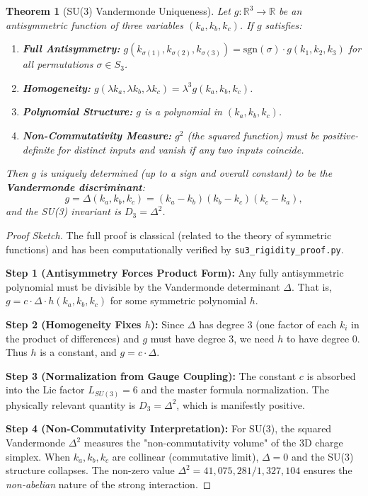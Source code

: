 \documentclass[11pt,twocolumn]{article}
\newtheorem{theorem}{Theorem}[section]
\begin{document}
\begin{theorem}[SU(3) Vandermonde Uniqueness]
Let $g: \mathbb{R}^3 \to \mathbb{R}$ be an antisymmetric function of three variables $(k_a, k_b, k_c)$. If $g$ satisfies:
\begin{enumerate}[label=(\roman*)]
    \item \textbf{Full Antisymmetry:} $g(k_{\sigma(1)}, k_{\sigma(2)}, k_{\sigma(3)}) = \text{sgn}(\sigma) \cdot g(k_1, k_2, k_3)$ for all permutations $\sigma \in S_3$.
    \item \textbf{Homogeneity:} $g(\lambda k_a, \lambda k_b, \lambda k_c) = \lambda^3 g(k_a, k_b, k_c)$.
    \item \textbf{Polynomial Structure:} $g$ is a polynomial in $(k_a, k_b, k_c)$.
    \item \textbf{Non-Commutativity Measure:} $g^2$ (the squared function) must be positive-definite for distinct inputs and vanish if any two inputs coincide.
\end{enumerate}
Then $g$ is uniquely determined (up to a sign and overall constant) to be the \textbf{Vandermonde discriminant}:
\begin{equation*}
g = \Delta(k_a, k_b, k_c) = (k_a - k_b)(k_b - k_c)(k_c - k_a),
\end{equation*}
and the SU(3) invariant is $D_3 = \Delta^2$.
\end{theorem}

\begin{proof}[Proof Sketch]
The full proof is classical (related to the theory of symmetric functions) and has been computationally verified by \texttt{su3\_rigidity\_proof.py}.

\textbf{Step 1 (Antisymmetry Forces Product Form):}
Any fully antisymmetric polynomial must be divisible by the Vandermonde determinant $\Delta$. That is, $g = c \cdot \Delta \cdot h(k_a, k_b, k_c)$ for some symmetric polynomial $h$.

\textbf{Step 2 (Homogeneity Fixes $h$):}
Since $\Delta$ has degree 3 (one factor of each $k_i$ in the product of differences) and $g$ must have degree 3, we need $h$ to have degree 0. Thus $h$ is a constant, and $g = c \cdot \Delta$.

\textbf{Step 3 (Normalization from Gauge Coupling):}
The constant $c$ is absorbed into the Lie factor $L_{SU(3)} = 6$ and the master formula normalization. The physically relevant quantity is $D_3 = \Delta^2$, which is manifestly positive.

\textbf{Step 4 (Non-Commutativity Interpretation):}
For SU(3), the squared Vandermonde $\Delta^2$ measures the "non-commutativity volume" of the 3D charge simplex. When $k_a, k_b, k_c$ are collinear (commutative limit), $\Delta = 0$ and the SU(3) structure collapses. The non-zero value $\Delta^2 = 41{,}075{,}281/1{,}327{,}104$ ensures the \emph{non-abelian} nature of the strong interaction.
\end{proof}
\end{document}
